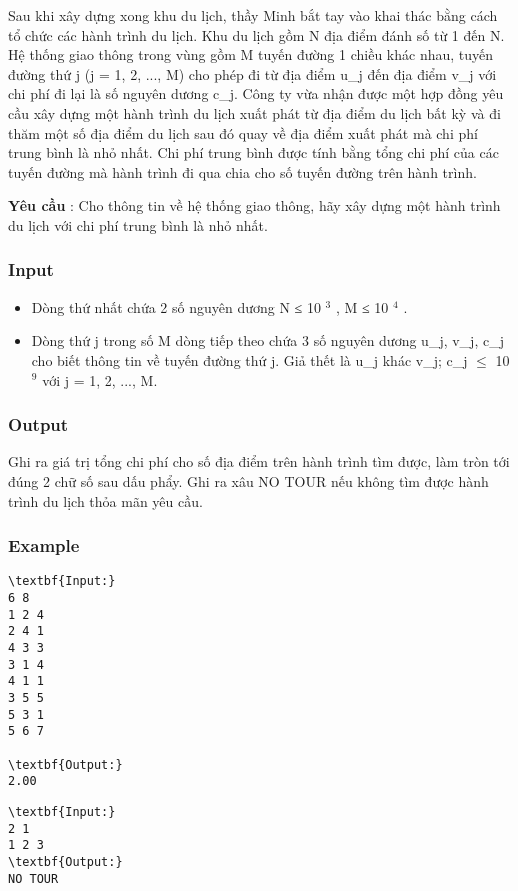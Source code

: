



   Sau khi xây dựng xong khu du lịch, thầy Minh bắt tay vào khai thác bằng cách tổ chức các hành trình du lịch. Khu du lịch gồm N địa điểm đánh số từ 1 đến N. Hệ thống giao thông trong vùng gồm M tuyến đường 1 chiều khác nhau, tuyến đường thứ j (j = 1, 2, ..., M) cho phép đi từ địa điểm u\_j đến địa điểm v\_j với chi phí đi lại là số nguyên dương c\_j. Công ty vừa nhận được một hợp đồng yêu cầu xây dựng một hành trình du lịch xuất phát từ địa điểm du lịch bất kỳ và đi thăm một số địa điểm du lịch sau đó quay về địa điểm xuất phát mà chi phí trung bình là nhỏ nhất. Chi phí trung bình được tính bằng tổng chi phí của các tuyến đường mà hành trình đi qua chia cho số tuyến đường trên hành trình.  

\textbf{    Yêu cầu   }   : Cho thông tin về hệ thống giao thông, hãy xây dựng một hành trình du lịch với chi phí trung bình là nhỏ nhất.  

\subsubsection{   Input  }
\begin{itemize}
	\item     Dòng thứ nhất chứa 2 số nguyên dương N ≤ 10    $^     3    $    , M         ≤ 10     $^      4     $     .    
	\item      Dòng thứ j trong số M dòng tiếp theo chứa 3 số nguyên dương u\_j, v\_j, c\_j cho biết thông tin về tuyến đường thứ j. Giả thết là u\_j khác v\_j; c\_j  $\le$  10     $^      9     $     với j = 1, 2, ..., M.    
\end{itemize}

\subsubsection{   Output  }

   Ghi ra giá trị tổng chi phí cho số địa điểm trên hành trình tìm được, làm tròn tới đúng 2 chữ số sau dấu phẩy. Ghi ra xâu NO TOUR nếu không tìm được hành trình du lịch thỏa mãn yêu cầu.  

\subsubsection{   Example  }
\begin{verbatim}
\textbf{Input:}
6 8
1 2 4 
2 4 1 
4 3 3 
3 1 4 
4 1 1 
3 5 5 
5 3 1 
5 6 7

\textbf{Output:}
2.00
\end{verbatim}


\begin{verbatim}
\textbf{Input:}
2 1
1 2 3
\textbf{Output:}
NO TOUR
\end{verbatim}
